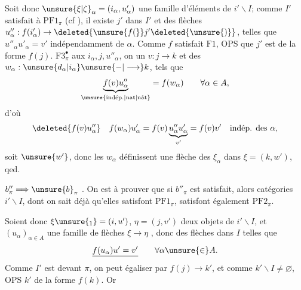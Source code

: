 Soit donc $\unsure{\xi|\zeta}_{\alpha}=(i_{\alpha},u'_{\alpha})$  une famille d'éléments de $i'\backslash I$;
comme $I'$ satisfait à $\mathrm{PF}1_{\pi}$ (cf ), il existe $j'$ dans $I'$ et des flèches $u''_{\alpha}:f(i'_{\alpha})\to\deleted{\unsure{f(}}j'\deleted{\unsure{)}}$, telles que $u''_{\alpha}u'_{\alpha}=v'$ indépendamment de $\alpha$.  Comme $f$ satisfait
$\mathrm{F}1$, OPS que $j'$ est de la forme $f(j)$.  $\mathrm{F}3^{\bullet}_{\pi}$ aux  $i_{\alpha},j,u''_{\alpha}$, on  un $v:j\longrightarrow k$ et des $w_{\alpha}:\unsure{d_{\alpha}|i_{\alpha}}\unsure{\mathbin{-}|\longrightarrow}k$, tels que
\[
 \underbrace{f(v)u''_{\alpha}}_{\unsure{\text{indép.}|\text{nat}|\text{nât}}}=f(w_{\alpha})\qquad\forall\alpha\in A,
\]
d'où
\[
 \deleted{f(v)u''_{\alpha}}\quad f(w_{\alpha})u'_{\alpha}
 = f(v)\underbrace{u''_{\alpha}u'_{\alpha}}_{v'}=f(v)v'\quad\text{indép. des }\alpha,
\]
soit $\unsure{w'}$, donc les $w_{\alpha}$ définissent une flèche des $\xi_{\alpha}$ dans $\xi=(k,w')$, qed.

$b''_{\pi}\Longrightarrow\unsure{b}_{\pi}$ . On est  à prouver que si $b''_{\pi}$ est satisfait,  alors   catégories $i'\backslash I$, dont on sait déjà qu'elles satisfont $\mathrm{PF}1_{\pi}$, satisfont également $\mathrm{PF}2_{\pi}$.

Soient donc $\xi\unsure{_{1}}=(i,u')$, $\eta=(j,v')$ deux objets de $i'\backslash I$, et $(u_{\alpha})_{\alpha\in A}$ une famille de flèches $\xi\longrightarrow\eta$ , donc des flèches dans $I$ telles que
\[
 \underline{f(u_{\alpha})u'=v'}\qquad\forall\alpha\unsure{\in}A.
\]
Comme $I'$ est  devant $\pi$, on peut égaliser par $f(j)\longrightarrow k'$, et comme  $k'\backslash I\ne\varnothing$, OPS $k'$ de la forme $f(k)$. Or
